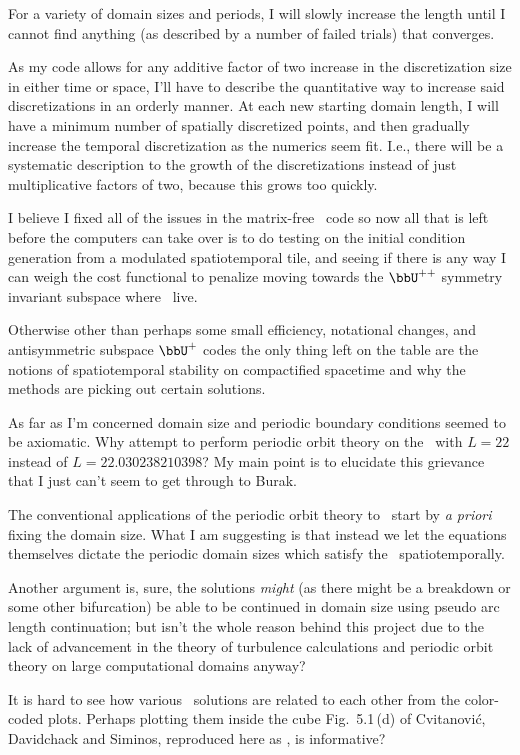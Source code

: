 \begin{itemize}
For a variety of domain sizes and periods, I will slowly increase the length until I cannot
find anything (as described by a number of failed trials) that converges.

As my code allows for any additive factor of two increase
in the discretization size in either time or space, I'll have to describe the quantitative
way to increase said discretizations in an orderly manner. At each new starting domain length,
I will have a minimum number of spatially discretized points, and then gradually increase the
temporal discretization as the numerics seem fit. I.e., there will be a systematic description
to the growth of the discretizations instead of just multiplicative factors of two, because
this grows too quickly.

I believe I fixed all of the issues in the matrix-free \rpo\ code so now all that is left
before the computers can take over is to do testing on the initial condition generation from
a modulated spatiotemporal tile, and  seeing
if there is any way I can weigh the cost functional to penalize moving towards the $\bbU^{++}$
symmetry invariant subspace where \eqva\ live.

Otherwise other than perhaps some small efficiency, notational changes,
and antisymmetric subspace $\bbU^+$ codes the only thing left on the
table are the notions of spatiotemporal stability on compactified
spacetime and why the methods are picking out certain solutions.

As far as I'm concerned domain size and periodic
boundary conditions seemed to be axiomatic. Why attempt to perform
periodic orbit theory on the \KSe\ with $L=22$ instead of $L=22.030238210398$? My main
point is to elucidate this grievance that I just can't seem to get through to Burak.

The conventional applications of the periodic orbit theory to \KS\ start by
\textit{a priori} fixing the domain size.
What I am suggesting is that instead we let the equations themselves
dictate the periodic domain sizes which satisfy the \KS\ spatiotemporally.

Another argument is, sure, the
solutions \emph{might} (as there might be a breakdown or some other bifurcation)
be able to be continued in domain size using pseudo arc length continuation; but isn't
the whole reason behind this project due to the lack of advancement in the theory of turbulence
calculations and periodic orbit theory on large computational domains anyway?

It is hard to see how various \eqv\ solutions are related to each other from
the color-coded plots. Perhaps plotting them inside the cube Fig.~5.1\,(d) of
Cvitanovi{\'c}, Davidchack and Siminos, reproduced here as
, is informative?


\end{itemize}
